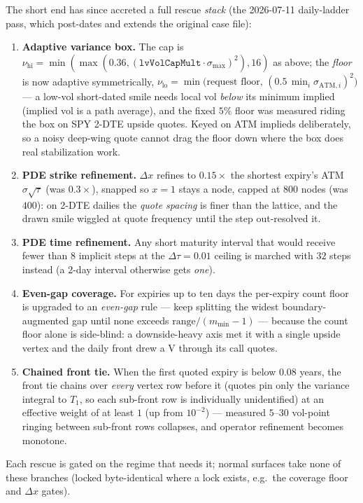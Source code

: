 \documentclass[11pt]{article}
\begin{document}
The short end has since accreted a full rescue \emph{stack} (the 2026-07-11
daily-ladder pass, which post-dates and extends the original case file):
\begin{enumerate}[leftmargin=1.6em]
\item \textbf{Adaptive variance box.} The cap is
$\nu_{\mathrm{hi}}=\min(\max(0.36,(\texttt{lvVolCapMult}\cdot
\sigma_{\max})^2),16)$ as above; the \emph{floor} is now adaptive
symmetrically, $\nu_{\mathrm{lo}}=\min\big(\text{request floor},\,
(0.5\,\min_i\sigma_{\mathrm{ATM},i})^2\big)$ --- a low-vol short-dated smile
needs local vol \emph{below} its minimum implied (implied vol is a path
average), and the fixed $5\%$ floor was measured riding the box on SPY 2-DTE
upside quotes. Keyed on ATM implieds deliberately, so a noisy deep-wing quote
cannot drag the floor down where the box does real stabilization work.
\item \textbf{PDE strike refinement.} $\Delta x$ refines to
$0.15\times$ the shortest expiry's ATM $\sigma\sqrt\tau$ (was $0.3\times$),
snapped so $x=1$ stays a node, capped at $800$ nodes (was $400$): on 2-DTE
dailies the \emph{quote spacing} is finer than the lattice, and the drawn
smile wiggled at quote frequency until the step out-resolved it.
\item \textbf{PDE time refinement.} Any short maturity interval that would
receive fewer than $8$ implicit steps at the $\Delta\tau=0.01$ ceiling is
marched with $32$ steps instead (a 2-day interval otherwise gets \emph{one}).
\item \textbf{Even-gap coverage.} For expiries up to ten days the per-expiry
count floor is upgraded to an \emph{even-gap} rule --- keep splitting the
widest boundary-augmented gap until none exceeds
$\text{range}/(m_{\min}-1)$ --- because the count floor alone is side-blind:
a downside-heavy axis met it with a single upside vertex and the daily front
drew a V through its call quotes.
\item \textbf{Chained front tie.} When the first quoted expiry is below
$0.08$ years, the front tie chains over \emph{every} vertex row before it
(quotes pin only the variance integral to $T_1$, so each sub-front row is
individually unidentified) at an effective weight of at least $1$ (up from
$10^{-2}$) --- measured $5$--$30$ vol-point ringing between sub-front rows
collapses, and operator refinement becomes monotone.
\end{enumerate}
Each rescue is gated on the regime that needs it; normal surfaces take none
of these branches (locked byte-identical where a lock exists, e.g.\ the
coverage floor and $\Delta x$ gates).
\end{document}
